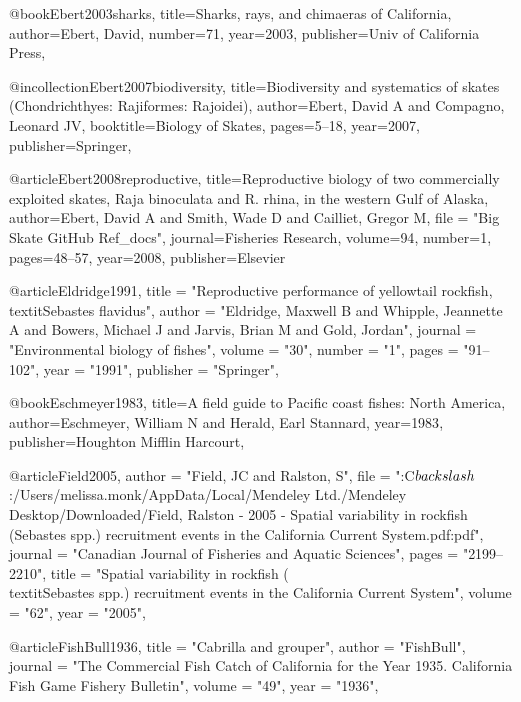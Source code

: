 @book{Ebert2003sharks,
  title={Sharks, rays, and chimaeras of California},
  author={Ebert, David},
  number={71},
  year={2003},
  publisher={Univ of California Press},
}


@incollection{Ebert2007biodiversity,
  title={Biodiversity and systematics of skates (Chondrichthyes: Rajiformes: Rajoidei)},
  author={Ebert, David A and Compagno, Leonard JV},
  booktitle={Biology of Skates},
  pages={5--18},
  year={2007},
  publisher={Springer},
}

@article{Ebert2008reproductive,
  title={Reproductive biology of two commercially exploited skates, Raja binoculata and R. rhina, in the western Gulf of Alaska},
  author={Ebert, David A and Smith, Wade D and Cailliet, Gregor M},
  file = "{Big Skate GitHub Ref_docs}",
  journal={Fisheries Research},
  volume={94},
  number={1},
  pages={48--57},
  year={2008},
  publisher={Elsevier}
}

@article{Eldridge1991,
    title = "{Reproductive performance of yellowtail rockfish, \\textit{{{Sebastes}} flavidus}}",
    author = "{Eldridge, Maxwell B and Whipple, Jeannette A and Bowers, Michael J and Jarvis, Brian M and Gold, Jordan}",
    journal = "{Environmental biology of fishes}",
    volume = "{30}",
    number = "{1}",
    pages = "{91--102}",
    year = "{1991}",
    publisher = "{Springer}",
}

@book{Eschmeyer1983,
  title={A field guide to Pacific coast fishes: North America},
  author={Eschmeyer, William N and Herald, Earl Stannard},
  year={1983},
  publisher={Houghton Mifflin Harcourt},
}

@article{Field2005,
    author = "{Field, JC and Ralston, S}",
    file = "{:C$\\backslash$:/Users/melissa.monk/AppData/Local/Mendeley Ltd./Mendeley Desktop/Downloaded/Field, Ralston - 2005 - Spatial variability in rockfish (Sebastes spp.) recruitment events in the California Current System.pdf:pdf}",
    journal = "{Canadian Journal of Fisheries and Aquatic Sciences}",
    pages = "{2199--2210}",
    title = "{{Spatial variability in rockfish (\\textit{{Sebastes}} spp.) recruitment events in the California Current System}}",
    volume = "{62}",
    year = "{2005}",
}

@article{FishBull1936,
    title = "{Cabrilla and grouper}",
    author = "{FishBull}",
    journal = "{The Commercial Fish Catch of California for the Year 1935. California Fish Game Fishery Bulletin}",
    volume = "{49}",
    year = "{1936}",
}

